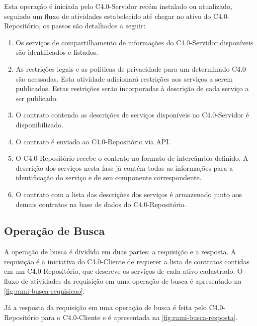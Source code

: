 Esta operação é iniciada pelo C4.0-Servidor recém instalado ou atualizado, seguindo um fluxo de atividades estabelecido até chegar no ativo do C4.0-Repositório, os passos são detalhados a seguir:

\begin{enumerate}

	\item Os serviços de compartilhamento de informações do C4.0-Servidor disponíveis são identificados e listados.

	\item As restrições legais e as políticas de privacidade para um determinado C4.0 são acessadas. Esta atividade adicionará restrições aos serviços a serem publicados. Estas restrições serão incorporadas à descrição de cada serviço a ser publicado.

	\item O contrato contendo as descrições de serviços disponíveis no C4.0-Servidor é disponibilizado.

	\item O contrato é enviado ao C4.0-Repositório via API.

	\item O C4.0-Repositório recebe o contrato no formato de intercâmbio definido. A descrição dos serviços nesta fase já contém todas as informações para a identificação do serviço e de seu componente correspondente.

	\item O contrato com a lista das descrições dos serviços é armazenado junto aos demais contratos na base de dados do C4.0-Repositório.

\end{enumerate}

\subsection{Operação de Busca}

A operação de busca é dividida em duas partes: a requisição e a resposta. A requisição é a iniciativa do C4.0-Cliente de requerer a lista de contratos contidas em um C4.0-Repositório, que descreve os serviços de cada ativo cadastrado. O fluxo de atividades da requisição em uma operação de busca é apresentado na \autoref{fig:rami-busca-requisicao}.

Já a resposta da requisição em uma operação de busca é feita pelo C4.0-Repositório para o C4.0-Cliente e é apresentada na \autoref{fig:rami-busca-resposta}.

